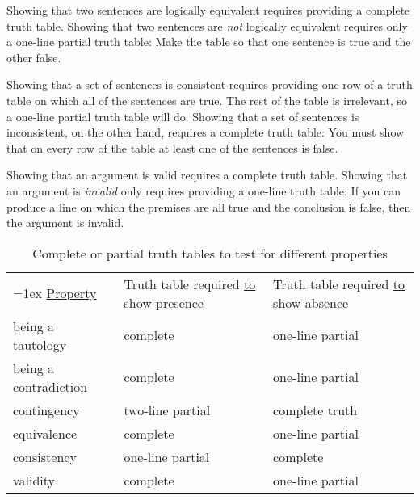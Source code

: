 Showing that two sentences are logically equivalent requires providing a complete truth table. Showing that two sentences are \emph{not} logically equivalent requires only a one-line partial truth table: Make the table so that one sentence is true and the other false.

Showing that a set of sentences is consistent requires providing one row of a truth table on which all of the sentences are true. The rest of the table is irrelevant, so a one-line partial truth table will do. Showing that a set of sentences is inconsistent, on the other hand, requires a complete truth table: You must show that on every row of the table at least one of the sentences is false.

Showing that an argument is valid requires a complete truth table. Showing that an argument is \emph{invalid} only requires providing a one-line truth table: If you can produce a line on which the premises are all true and the conclusion is false, then the argument is invalid.

\begin{table}
\begin{mdframed}[style=mytablebox]
\begin{center}
\begin{tabu}{X[1,l,b] X[1,l,b] X[1,l,b]}
\tabulinesep=1ex
\underline{Property}	& Truth table required \newline \underline{to show presence}		&	Truth table required \newline \underline{to show absence} \\ 
being a tautology		& complete 													 		& one-line partial \\ 
being a contradiction 	& complete 													 		& one-line partial \\ 
contingency				& two-line partial 													& complete truth \\ 
equivalence				& complete 													 		& one-line partial\\ 
consistency				& one-line partial 													& complete \\ 
validity					& complete 															& one-line partial \\ 
\end{tabu}
\end{center}
\end{mdframed}
\caption{Complete or partial truth tables to test for different properties}
\label{table.CompleteVsPartial}
\end{table}


